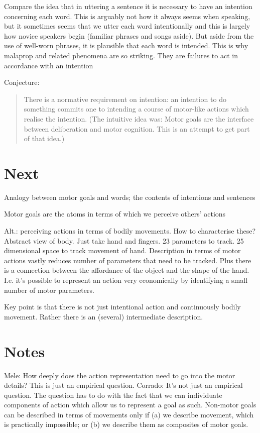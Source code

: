 \documentclass[12pt,a4paper]{extarticle}
\begin{document}
Compare the idea that in uttering a sentence it is necessary to have an intention concerning each word.
This is arguably not how it always seems when speaking, but it sometimes seems that we utter each word intentionally and this is largely how novice speakers begin (familiar phrases and songs aside).
But aside from the use of well-worn phrases, it is plausible that each word is intended.
This is why malaprop and related phenomena are so striking.
They are failures to act in accordance with an intention


Conjecture:
\begin{quote}
There is a normative requirement on intention: an intention to do something commits one to intending a course of motor-like actions which realise the intention.  (The intuitive idea was: Motor goals are the interface between deliberation and motor cognition.  This is an attempt to get part of that idea.)
\end{quote}
%


\section{Next}

Analogy between motor goals and words; the contents of intentions and sentences

Motor goals are the atoms in terms of which we perceive others' actions

Alt.: perceiving actions in terms of bodily movements.  How to characterise these?  Abstract view of body.  Just take hand and fingers.  23 parameters to track.  25 dimensional space to track movement of hand.  Description in terms of motor actions vastly reduces number of parameters that need to be tracked.  Plus there is a connection between the affordance of the object and the shape of the hand.
I.e. it's possible to represent an action very economically by identifying a small number of motor parameters.


Key point is that there is not just intentional action and continuously bodily movement.
Rather there is an (several) intermediate description.



\section{Notes}

Mele: How deeply does the action representation need to go into the motor details?  
This is just an empirical question. 
Corrado: It's not just an empirical question.  
The question has to do with the fact that we can individuate components of action which allow us to represent a goal as such.  
Non-motor goals can be described in terms of movements only if (a) we describe movement, which is practically impossible; or (b) we describe them as composites of motor goals.
\end{document}
